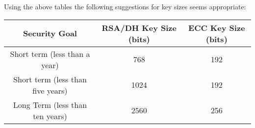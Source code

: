 \documentclass{book}
\begin{document}
Using the above tables the following suggestions for key sizes seems appropriate:
\begin{center}
\begin{tabular}{|c|c|c|}
    \hline Security Goal & RSA/DH Key Size (bits) & ECC Key Size (bits) \\
    \hline Short term (less than a year) & 768 & 192 \\
    \hline Short term (less than five years) & 1024 & 192 \\
    \hline Long Term (less than ten years) & 2560 & 256 \\
    \hline 
\end{tabular}
\end{center}
\end{document}
